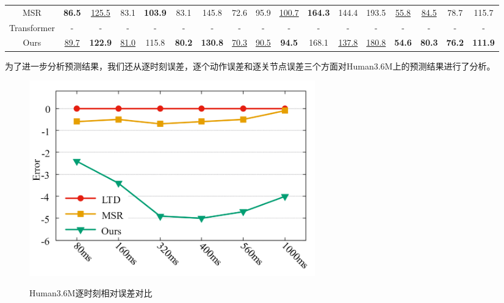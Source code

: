 \begin{table}[h]
{\begin{tabular}{c|cc|cc|cc|cc|cc|cc|cc|cc}
MSR   & \textbf{86.5} & \underline{125.5}          & 83.1          & \textbf{103.9} & 83.1           & 145.8          & 72.6            & 95.9          & \underline{100.7}         & \textbf{164.3} & 144.4          & 193.5          & \underline{55.8}             & \underline{84.5}             & 78.7           & 115.7          \\
Transformer & -             & -              & -             & -              & -              & -              & -               & -             & -             & -              & -              & -              & -                & -                & -              & -              \\
Ours   & \underline{89.7}          & \textbf{122.9} & \underline{81.0} & 115.8          & \textbf{80.2}  & \textbf{130.8} & \underline{70.3}   & \underline{90.5} & \textbf{94.5} & 168.1          & \underline{137.8} & \underline{180.8}          & \textbf{54.6}    & \textbf{80.3}    & \textbf{76.2}  & \textbf{111.9} \\ \hline
\end{tabular}
}
\label{table:human3.6 long-term 8}
\end{table}
\clearpage


为了进一步分析预测结果，我们还从逐时刻误差，逐个动作误差和逐关节点误差三个方面对Human3.6M上的预测结果进行了分析。
\begin{figure}[ht]
    \centering
    \includegraphics[width=0.60\textwidth]{FigMa/per_time.png}\\
    \vspace{-0.3cm}
    \caption{Human3.6M逐时刻相对误差对比}
    \label{fig:per_time_error}
\end{figure}

